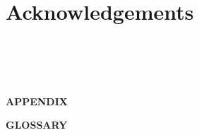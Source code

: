 \documentclass[lscape]{msu-thesis}
\begin{document}
\chapter*{Acknowledgements}
\DoubleSpacing %

\clearpage
\SingleSpacing
\tableofcontents* %
\clearpage
\listoftables %
\clearpage
\listoffigures %
%
%
\mainmatter
%







%
%
%
%
%
%
\clearpage
\appendix
\chapter*{\ }
\begin{center}
\textbf{APPENDIX}

\textbf{GLOSSARY}
\end{center}

%
\backmatter
%
%
\makebibliographycover %
%
\SingleSpacing


\end{document}
